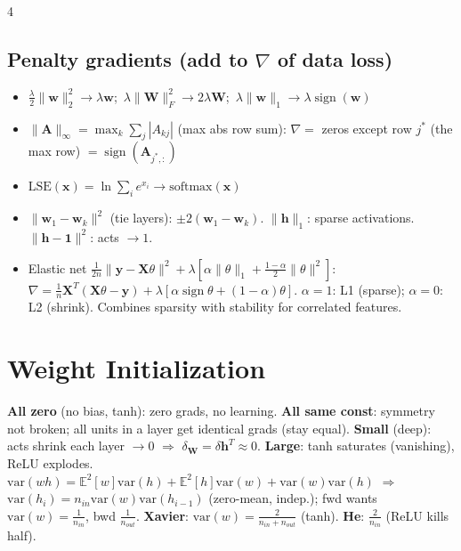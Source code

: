 \documentclass[8pt,landscape]{extarticle}
\newcommand{\x}{\mathbf{x}}
\newcommand{\y}{\mathbf{y}}
\newcommand{\h}{\mathbf{h}}
\newcommand{\W}{\mathbf{W}}
\newcommand{\w}{\mathbf{w}}
\newcommand{\X}{\mathbf{X}}
\newcommand{\A}{\mathbf{A}}
\newcommand{\E}{\mathbb{E}}
\newcommand{\sgn}{\operatorname{sign}}
\begin{document}
\begin{multicols*}{4}
\subsection{Penalty gradients (add to $\nabla$ of data loss)}
\begin{itemize}
\item $\frac\lambda2\|\w\|_2^2\to\lambda\w$;\ $\lambda\|\W\|_F^2\to2\lambda\W$;\ $\lambda\|\w\|_1\to\lambda\sgn(\w)$
\item $\|\A\|_\infty=\max_k\sum_j|A_{kj}|$ (max abs row sum): $\nabla=$ zeros except row $j^*$ (the max row) $=\sgn(\A_{j^*,:})$
\item $\text{LSE}(\x)=\ln\sum_ie^{x_i}\to\text{softmax}(\x)$
\item $\|\w_1-\w_k\|^2$ (tie layers): $\pm2(\w_1-\w_k)$. $\|\h\|_1$: sparse activations. $\|\h-\mathbf 1\|^2$: acts $\to1$.
\item Elastic net $\frac1{2n}\|\y-\X\theta\|^2+\lambda[\alpha\|\theta\|_1+\frac{1-\alpha}2\|\theta\|^2]$: $\nabla=\frac1n\X^T(\X\theta-\y)+\lambda[\alpha\sgn\theta+(1-\alpha)\theta]$. $\alpha{=}1$: L1 (sparse); $\alpha{=}0$: L2 (shrink). Combines sparsity with stability for correlated features.
\end{itemize}

\section{Weight Initialization}
\textbf{All zero} (no bias, tanh): zero grads, no learning. \textbf{All same const}: symmetry not broken; all units in a layer get identical grads (stay equal). \textbf{Small} (deep): acts shrink each layer $\to0$ $\Rightarrow$ $\delta_\W=\delta\h^T\approx0$. \textbf{Large}: tanh saturates (vanishing), ReLU explodes.
$\text{var}(wh)=\E^2[w]\text{var}(h)+\E^2[h]\text{var}(w)+\text{var}(w)\text{var}(h)$ $\Rightarrow$ $\text{var}(h_i)=n_{in}\text{var}(w)\text{var}(h_{i-1})$ (zero-mean, indep.); fwd wants $\text{var}(w)=\frac1{n_{in}}$, bwd $\frac1{n_{out}}$. \textbf{Xavier}: $\text{var}(w)=\frac{2}{n_{in}+n_{out}}$ (tanh). \textbf{He}: $\frac2{n_{in}}$ (ReLU kills half).


\end{multicols*}
\end{document}
